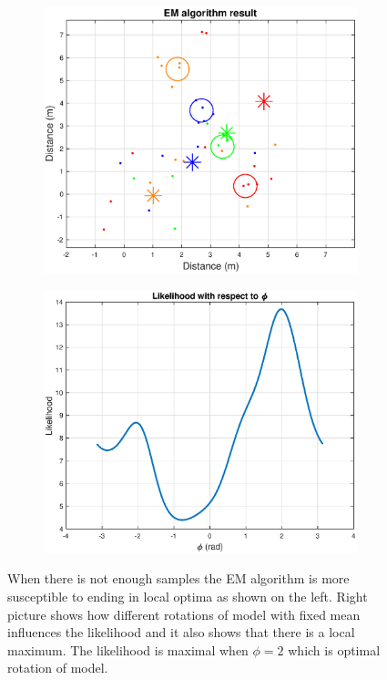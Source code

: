 \begin{figure}[H]
	\centering
	\begin{subfigure}{0.49\textwidth}
		\centering
		\includegraphics[scale=0.43]{fig/em_local.eps}
	\end{subfigure}
	\begin{subfigure}{.49\textwidth}
		\centering
		\includegraphics[scale=0.43]{fig/em_local_chart.eps}
		
	\end{subfigure}
	
	\caption[EM local optima]{When there is not enough samples the EM algorithm is more susceptible to ending in local optima as shown on the left. Right picture shows how different rotations of model with fixed mean influences the likelihood and it also shows that there is a local maximum. The likelihood is maximal when $\phi = 2$ which is optimal rotation of model.}
	\label{fig:em_local}
\end{figure}

